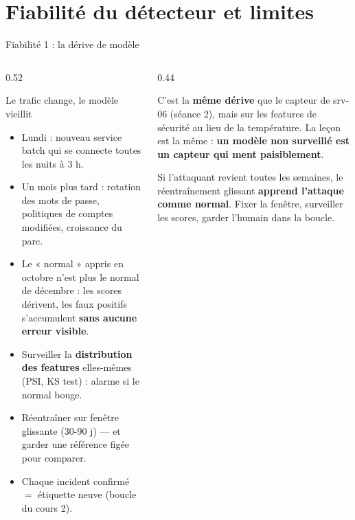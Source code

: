 \section{Fiabilité du détecteur et limites}

\begin{frame}{Fiabilité 1 : la dérive de modèle}
\footnotesize%
\begin{columns}[t]
\begin{column}{0.52\textwidth}
\begin{block}{Le trafic change, le modèle vieillit}
\begin{itemize}
\item Lundi : nouveau service batch qui se connecte toutes les nuits à 3 h.
\item Un mois plus tard : rotation des mots de passe, politiques de comptes
modifiées, croissance du parc.
\item Le « normal » appris en octobre n'est plus le normal de décembre :
les scores dérivent, les faux positifs s'accumulent \textbf{sans aucune
erreur visible}.
\end{itemize}
\end{block}
\begin{ebox}
\begin{itemize}
\item Surveiller la \textbf{distribution des features} elles-mêmes
(PSI, KS test) : alarme si le normal bouge.
\item Réentraîner sur fenêtre glissante (30-90 j) --- et garder une
référence figée pour comparer.
\item Chaque incident confirmé $=$ étiquette neuve (boucle du cours 2).
\end{itemize}
\end{ebox}
\end{column}
\begin{column}{0.44\textwidth}
\begin{kbox}
C'est la \textbf{même dérive} que le capteur de srv-06 (séance 2), mais sur
les features de sécurité au lieu de la température. La leçon est la même :
\textbf{un modèle non surveillé est un capteur qui ment paisiblement}.
\end{kbox}
\begin{wbox}
Si l'attaquant revient toutes les semaines, le réentraînement glissant
\textbf{apprend l'attaque comme normal}. Fixer la fenêtre, surveiller les
scores, garder l'humain dans la boucle.
\end{wbox}
\end{column}
\end{columns}
\end{frame}

